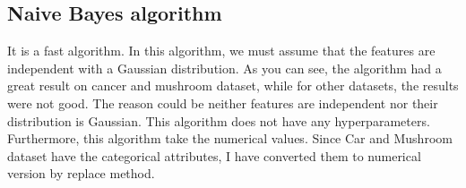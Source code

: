 \begin{table}[H]
\centering
\caption{The accuracy of KNN on mushroom dataset.}
\label{tab:tab_knn_mushroom}

\end{table}











\subsection{Naive Bayes algorithm}

 

It is a fast algorithm. In this algorithm, we must assume that the features are independent with a Gaussian distribution. As you can see, the algorithm had a great result on cancer and mushroom dataset, while for other datasets, the results were not good. The reason could be neither features are independent nor their distribution is Gaussian. This algorithm does not have any hyperparameters. Furthermore, this algorithm take the numerical values. Since Car and Mushroom dataset have the categorical attributes, I have converted them to numerical version by replace method.       



\begin{table}[H]
\centering
\caption{The accuracy of Naive Bayes on cancer dataset.}
\label{tab:tab_NB_canc}

\end{table}

\begin{table}[H]
\centering
\caption{The accuracy of Naive Bayes on cars dataset.}
\label{tab:tab_NB_cars}

\end{table}

\begin{table}[H]
\centering
\caption{The accuracy of Naive Bayes on ecol dataset.}
\label{tab:tab_NB_ecol}

\end{table}

\begin{table}[H]
\centering
\caption{The accuracy of Naive Bayes on letter dataset.}
\label{tab:tab_NB_letter}

\end{table}


